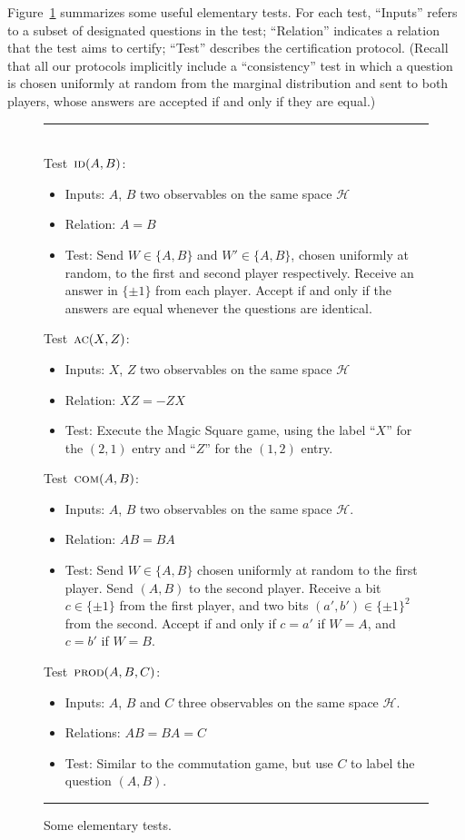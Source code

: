 \documentclass[11pt]{article}
\theoremstyle{remark}
\theoremstyle{definition}
\newcommand{\mH}{\mathcal{H}}
\newcommand{\prodt}{\textsc{prod}}
\newcommand{\comt}{\textsc{com}}
\newcommand{\act}{\textsc{ac}}
\newcommand{\idt}{\textsc{id}}
\begin{document}
Figure~\ref{fig:elementary} summarizes some useful elementary tests. For each test, ``Inputs'' refers to a subset of designated questions in the test; ``Relation'' indicates a relation that the test aims to certify; ``Test'' describes the certification protocol. (Recall that all our protocols implicitly include a ``consistency'' test in which a question is chosen uniformly at random from the marginal distribution and sent to both players, whose answers are accepted if and only if they are equal.)

\begin{figure}[H]
\rule[1ex]{16.5cm}{0.5pt}\\
Test~$\idt(A,B)$:
\begin{itemize}
    \item Inputs: $A$, $B$ two observables on the same space $\mH$
    \item Relation: $A=B$
    \item Test: Send $W \in \{A,B\}$ and $W'\in\{A,B\}$, chosen uniformly at random, to the first and second player respectively. Receive an answer in $\{\pm 1\}$ from each player. Accept if and only if the answers are equal whenever the questions are identical. 
\end{itemize}
Test~$\act(X,Z)$:
\begin{itemize}
    \item Inputs: $X$, $Z$ two observables on the same space $\mH$
    \item Relation: $XZ=-ZX$
    \item Test: Execute the Magic Square game, using the label ``$X$'' for the $(2,1)$ entry and ``$Z$'' for the $(1,2)$ entry.  
\end{itemize}
Test~$\comt(A,B)$:
\begin{itemize}
    \item Inputs: $A$, $B$ two observables on the same space $\mH$.
    \item Relation: $AB=BA$
    \item Test: Send $W\in\{A,B\}$ chosen uniformly at random to the first player. Send $(A,B)$ to the second player. Receive a bit $c\in\{\pm 1\}$ from the first player, and two bits $(a',b')\in\{\pm 1\}^2$ from the second. Accept if and only if $c=a'$ if $W=A$, and $c=b'$ if $W=B$. 
\end{itemize}
Test~$\prodt(A,B,C)$:
\begin{itemize}
    \item Inputs: $A$, $B$ and $C$ three observables on the same space $\mH$.
    \item Relations: $AB=BA=C$
    \item Test: Similar to the commutation game, but use $C$ to label the question $(A,B)$.
\end{itemize}
\rule[2ex]{16.5cm}{0.5pt}\vspace{-1cm}
\caption{Some elementary tests.}
\label{fig:elementary}
\end{figure}
\end{document}
